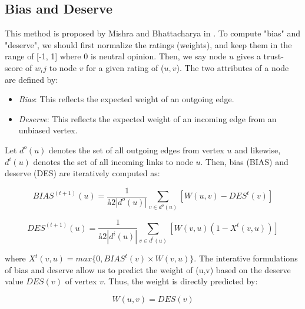 
\subsection{Bias and Deserve}
This method is proposed by Mishra and Bhattacharya in \cite{mishra2011finding}.
To compute "bias" and "deserve", we should first normalize the ratings (weights),
and keep them in the range of [-1, 1] where 0 is neutral opinion. Then, we say node $u$ gives a trust-score
of $w_ij$ to node $v$ for a given rating of ($u, v$). The two attributes of a node are 
defined by:

\begin{itemize}
	\item \emph{Bias}: This reflects the expected weight of an outgoing edge.  
	\item \emph{Deserve}: This reflects the expected weight of an incoming edge from an unbiased vertex.
\end{itemize}

Let $d^o(u)$ denotes the set of all outgoing edges from vertex $u$ and likewise,
$d^i(u)$ denotes the set of all incoming links to node $u$. Then, bias (BIAS) and
deserve (DES) are iteratively computed as:

\begin{equation}
    BIAS^{(t+1)}(u)=\frac{1}{å2|d^o(u)|}\sum_{v \in d^o(u)}[W(u,v) - DES^t(v)]
\end{equation}

\begin{equation}
    DES^{(t+1)}(u)=\frac{1}{å2|d^i(u)|}\sum_{v \in d^i(u)}[W(v,u)(1 - X^t(v,u))]
\end{equation}

where $X^t(v,u) = max\{0, BIAS^t(v) \times W(v,u)\}$. The interative formulations
of bias and deserve allow us to predict the weight of (u,v) based on the deserve
value $DES(v)$ of vertex $v$. Thus, the weight is directly predicted by:

\begin{equation}
    W(u,v) = DES(v)
\end{equation}